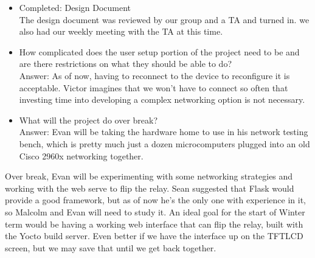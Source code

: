 \documentclass[letterpaper,10pt]{article}
\begin{document}
\begin{itemize}
    \item Completed: Design Document\\
        The design document was reviewed by our group and a TA and turned in.
        we also had our weekly meeting with the TA at this time.  
    \item How complicated does the user setup portion of the project need to be
        and are there restrictions on what they should be able to do?\\
        Answer: As of now, having to reconnect to the device to reconfigure it
        is acceptable. Victor imagines that we won't have to connect so often
        that investing time into developing a complex networking option is not
        necessary.
    \item What will the project do over break?\\
        Answer: Evan will be taking the hardware home to use in his network
        testing bench, which is pretty much just a dozen microcomputers plugged
        into an old Cisco 2960x networking together. 
\end{itemize}

Over break, Evan will be experimenting with some networking strategies and
working with the web serve to flip the relay. Sean suggested that Flask would
provide a good framework, but as of now he's the only one with experience in
it, so Malcolm and Evan will need to study it. An ideal goal for the start of
Winter term would be having a working web interface that can flip the relay,
built with the Yocto build server. Even better if we have the interface up on
the TFTLCD screen, but we may save that until we get back together.
\end{document}
